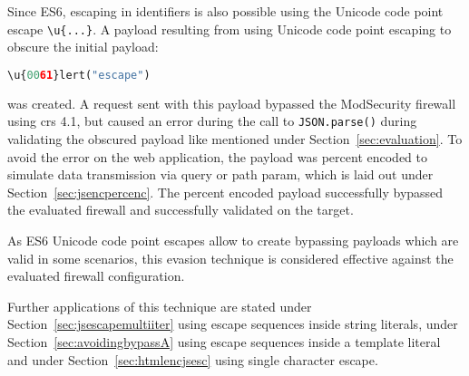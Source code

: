 Since ES6, escaping in identifiers is also possible using the Unicode code point escape \verb|\u{...}|. A payload resulting from using Unicode code point escaping to obscure the initial payload:

\begin{lstlisting}[style=basicStyle, language=Python]
\u{0061}lert("escape")
\end{lstlisting}
was created. A request sent with this payload bypassed the ModSecurity firewall using \acrshort{crs} 4.1, but caused an error during the call to \verb|JSON.parse()| during validating the obscured payload like mentioned under Section~\ref{sec:evaluation}. 
To avoid the error on the web application, the payload was percent encoded to simulate data transmission via query or path param, which is laid out under Section~\ref{sec:jsencpercenc}. 
The percent encoded payload successfully bypassed the evaluated firewall and successfully validated on the target.

As ES6 Unicode code point escapes allow to create bypassing payloads which are valid in some scenarios, this evasion technique is considered effective against the evaluated firewall configuration.

Further applications of this technique are stated under Section~\ref{sec:jsescapemultiiter} using escape sequences inside string literals, under Section~\ref{sec:avoidingbypassA} using escape sequences inside a template literal and under Section~\ref{sec:htmlencjsesc} using single character escape.

%
%
%

